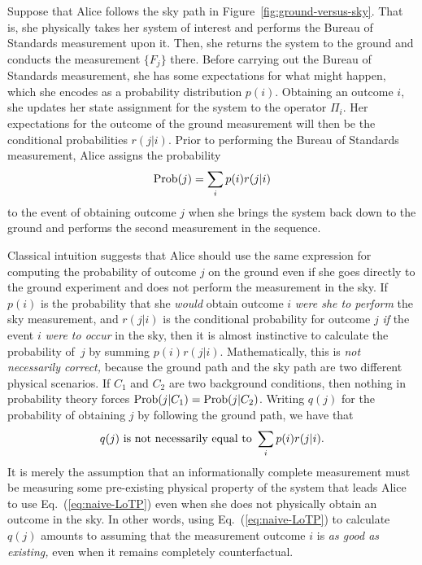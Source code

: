 \documentclass[aps,pra,superscriptaddress,10pt,tightenlines,twocolumn,nofootinbib]{revtex4}
\theoremstyle{remark}
\begin{document}
Suppose that Alice follows the sky path in
Figure~\ref{fig:ground-versus-sky}.  That is, she physically takes her
system of interest and performs the Bureau of Standards measurement
upon it.  Then, she returns the system to the ground and conducts the
measurement $\{F_j\}$ there.  Before carrying out the Bureau of
Standards measurement, she has some expectations for what might
happen, which she encodes as a probability distribution $p(i)$.
Obtaining an outcome $i$, she updates her state assignment for the
system to the operator $\Pi_i$.  Her expectations for the outcome of
the ground measurement will then be the conditional probabilities
$r(j|i)$.  Prior to performing the Bureau of Standards measurement,
Alice assigns the probability
\begin{equation}
\hbox{Prob}(j) = \sum_i p(i) r(j|i)
\label{eq:naive-LoTP}
\end{equation}
to the event of obtaining outcome $j$ when she brings the system back
down to the ground and performs the second measurement in the sequence.

Classical intuition suggests that Alice should use the same expression
for computing the probability of outcome $j$ on the ground even if she
goes directly to the ground experiment and does not perform the
measurement in the sky.  If $p(i)$ is the probability that she
\emph{would} obtain outcome $i$ \emph{were she to perform} the sky
measurement, and $r(j|i)$ is the conditional probability for outcome
$j$ \emph{if} the event $i$ \emph{were to occur} in the sky, then it
is almost instinctive to calculate the probability of~$j$ by summing
$p(i) r(j|i)$.  Mathematically, this is \emph{not necessarily
  correct,} because the ground path and the sky path are two different
physical scenarios.  If $C_1$ and $C_2$ are two background conditions,
then nothing in probability theory forces $\hbox{Prob}(j|C_1) =
\hbox{Prob}(j|C_2)$.  Writing $q(j)$ for the probability of obtaining
$j$ by following the ground path, we have that
\begin{equation}
q(j) \hbox{ is not necessarily equal to }
 \sum_i p(i) r(j|i).
\end{equation}
It is merely the assumption that an informationally complete
measurement must be measuring some pre-existing physical property of
the system that leads Alice to use Eq.~(\ref{eq:naive-LoTP}) even when
she does not physically obtain an outcome in the sky.  In other words,
using Eq.~(\ref{eq:naive-LoTP}) to calculate $q(j)$ amounts to
assuming that the measurement outcome $i$ is \emph{as good as
  existing,} even when it remains completely counterfactual.
\end{document}
